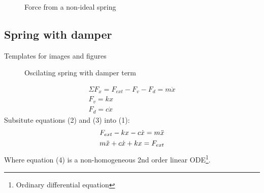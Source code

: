 \documentclass[11pt, a4paper]{article}
\begin{document}
\begin{figure}[h]
  \centering
  \qquad
  \qquad
  \caption{Force from a non-ideal spring}
\end{figure}

\subsection{Spring with damper}
\setcounter{equation}{0}
Templates for images and figures
\begin{figure}[h]
  \centering
  \qquad
  \caption{Oscilating spring with damper term}
\end{figure}
\begin{gather}
  \Sigma F_x = F_{ext} - F_v - F_d = m\ddot{x}\\
  F_v = kx\\
  F_d = c\dot{x}
\end{gather}
Subsitute equations (2) and (3) into (1):
\begin{gather}
  F_{ext} - kx - c\dot{x} = m\ddot{x} \notag \\
  m\ddot{x} + c\dot{x} + kx = F_{ext}
\end{gather}
Where equation (4) is a non-homogeneous 2nd order linear ODE\footnote{Ordinary differential equation}.
\end{document}
